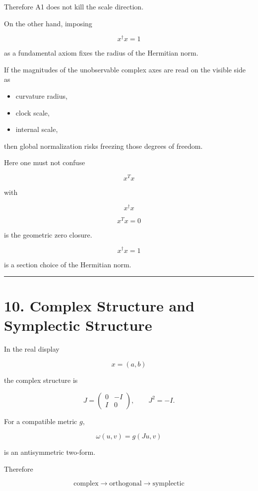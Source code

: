 \documentclass[
  a4paper,
]{article}
\providecommand{\tightlist}{%
  \setlength{\itemsep}{0pt}\setlength{\parskip}{0pt}}
\begin{document}
Therefore A1 does not kill the scale direction.

On the other hand, imposing

\[
x^\dagger x=1
\]

as a fundamental axiom fixes the radius of the Hermitian norm.

If the magnitudes of the unobservable complex axes are read on the
visible side as

\begin{itemize}
\tightlist
\item
  curvature radius,
\item
  clock scale,
\item
  internal scale,
\end{itemize}

then global normalization risks freezing those degrees of freedom.

Here one must not confuse

\[
x^Tx
\]

with

\[
x^\dagger x
\]

\[
\boxed{
x^Tx=0
}
\]

is the geometric zero closure.

\[
\boxed{
x^\dagger x=1
}
\]

is a section choice of the Hermitian norm.

\begin{center}\rule{0.5\linewidth}{0.5pt}\end{center}

\section{10. Complex Structure and Symplectic
Structure}\label{complex-structure-and-symplectic-structure}

In the real display

\[
x=(a,b)
\]

the complex structure is

\[
J=
\begin{pmatrix}
0&-I\\
I&0
\end{pmatrix},
\qquad
J^2=-I.
\]

For a compatible metric \(g\),

\[
\omega(u,v)=g(Ju,v)
\]

is an antisymmetric two-form.

Therefore

\[
\boxed{
\text{complex}
\to
\text{orthogonal}
\to
\text{symplectic}
}
\]
\end{document}
